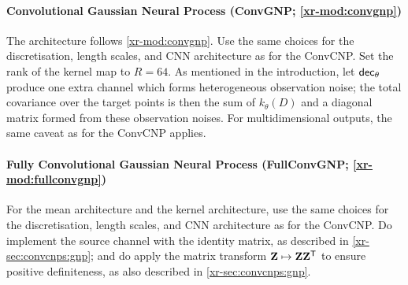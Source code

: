 \documentclass[12pt]{report}
\newcommand{\xrprefix}[1]{xr-#1}
\begin{document}
\paragraph{Convolutional Gaussian Neural Process (ConvGNP; \cref{\xrprefix{mod:convgnp}})}
The architecture follows \cref{\xrprefix{mod:convgnp}}.
Use the same choices for the discretisation, length scales, and CNN architecture as for the ConvCNP.
Set the rank of the kernel map to $R = 64$.
As mentioned in the introduction, let $\mathsf{dec}_\theta$ produce one extra channel which forms heterogeneous observation noise;
the total covariance over the target points is then the sum of $k_\theta(D)$ and a diagonal matrix formed from these observation noises.
For multidimensional outputs, the same caveat as for the ConvCNP applies.

\paragraph{Fully Convolutional Gaussian Neural Process (FullConvGNP; \cref{\xrprefix{mod:fullconvgnp}})}
%
For the mean architecture and the kernel architecture, use the same choices for the discretisation, length scales, and CNN architecture as for the ConvCNP.
Do implement the source channel with the identity matrix, as described in \cref{\xrprefix{sec:convcnps:gnp}};
and do apply the matrix transform $\mZ \mapsto \mZ \mZ^\T$ to ensure positive definiteness, as also described in \cref{\xrprefix{sec:convcnps:gnp}}.
\end{document}
